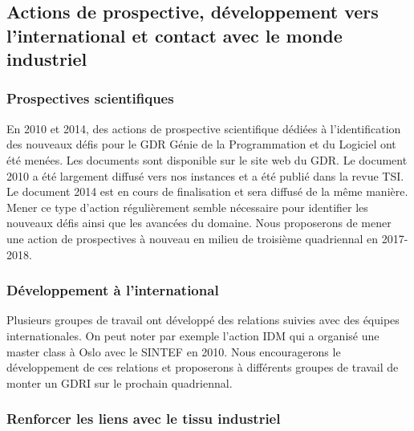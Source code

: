\documentclass[11pt]{article}
\newcommand{\mynote}[3][black]{\textcolor{#1}{\fbox{\bfseries\sffamily\scriptsize{#2}}
{\small$\blacktriangleright$\textsf{\emph{#3}}$\blacktriangleleft$}}}
\newcommand{\pem}[1]{} %
\begin{document}


\subsection{Actions de prospective, développement vers l'international et contact avec le monde industriel}

\subsubsection{Prospectives scientifiques}

En 2010 et 2014, des actions de prospective scientifique dédiées à
l'identification des nouveaux défis pour le GDR Génie de la Programmation et du
Logiciel ont été menées. Les documents sont disponible sur le site web du GDR.
Le document 2010 a été largement diffusé vers nos instances et a été publié
dans la revue TSI. Le document 2014 est en cours de finalisation et sera
diffusé de la même manière. Mener ce type d'action régulièrement semble
nécessaire pour identifier les nouveaux défis ainsi que les avancées du
domaine. Nous proposerons de mener une action de prospectives à nouveau en
milieu de troisième quadriennal en 2017-2018.

\subsubsection{Développement à l'international}
\pem{mettre à jour ?}
Plusieurs groupes de travail ont développé des relations  suivies avec des équipes internationales. On peut noter par exemple l'action IDM qui a organisé une master class à Oslo avec le SINTEF en 2010. Nous encouragerons le développement de ces relations et proposerons à différents groupes de travail de monter un GDRI sur le prochain quadriennal. 

\subsubsection{Renforcer les liens avec le tissu industriel}
\end{document}
